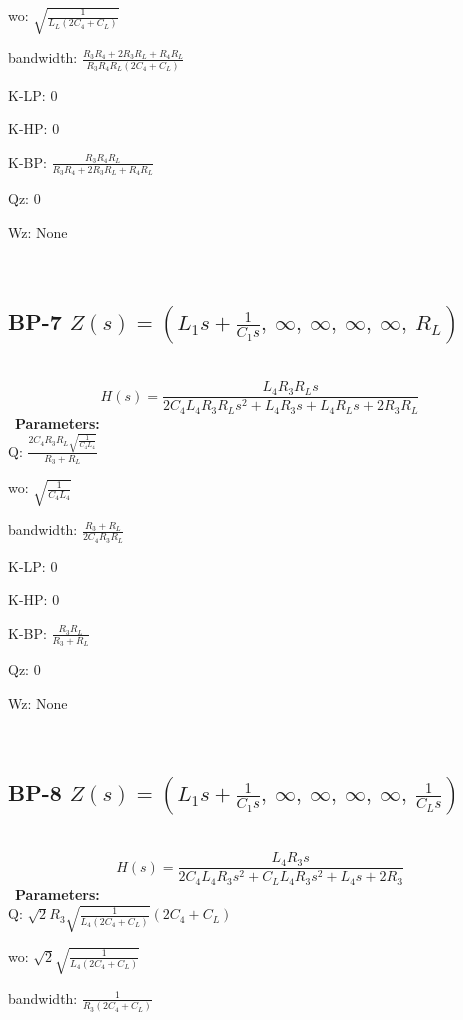 \documentclass{article}
\begin{document}
wo: $\sqrt{\frac{1}{L_{L} \left(2 C_{4} + C_{L}\right)}}$\ 

bandwidth: $\frac{R_{3} R_{4} + 2 R_{3} R_{L} + R_{4} R_{L}}{R_{3} R_{4} R_{L} \left(2 C_{4} + C_{L}\right)}$\ 

K-LP: $0$\ 

K-HP: $0$\ 

K-BP: $\frac{R_{3} R_{4} R_{L}}{R_{3} R_{4} + 2 R_{3} R_{L} + R_{4} R_{L}}$\ 

Qz: $0$\ 

Wz: $\text{None}$\ 

\ 

\subsection{BP-7 $Z(s) = \left( L_{1} s + \frac{1}{C_{1} s}, \  \infty, \  \infty, \  \infty, \  \infty, \  R_{L}\right)$ } \ 
\textbf{\[H(s) = \frac{L_{4} R_{3} R_{L} s}{2 C_{4} L_{4} R_{3} R_{L} s^{2} + L_{4} R_{3} s + L_{4} R_{L} s + 2 R_{3} R_{L}}\] } \ 
\textbf{Parameters:}\\ 

Q: $\frac{2 C_{4} R_{3} R_{L} \sqrt{\frac{1}{C_{4} L_{4}}}}{R_{3} + R_{L}}$\ 

wo: $\sqrt{\frac{1}{C_{4} L_{4}}}$\ 

bandwidth: $\frac{R_{3} + R_{L}}{2 C_{4} R_{3} R_{L}}$\ 

K-LP: $0$\ 

K-HP: $0$\ 

K-BP: $\frac{R_{3} R_{L}}{R_{3} + R_{L}}$\ 

Qz: $0$\ 

Wz: $\text{None}$\ 

\ 

\subsection{BP-8 $Z(s) = \left( L_{1} s + \frac{1}{C_{1} s}, \  \infty, \  \infty, \  \infty, \  \infty, \  \frac{1}{C_{L} s}\right)$ } \ 
\textbf{\[H(s) = \frac{L_{4} R_{3} s}{2 C_{4} L_{4} R_{3} s^{2} + C_{L} L_{4} R_{3} s^{2} + L_{4} s + 2 R_{3}}\] } \ 
\textbf{Parameters:}\\ 

Q: $\sqrt{2} R_{3} \sqrt{\frac{1}{L_{4} \left(2 C_{4} + C_{L}\right)}} \left(2 C_{4} + C_{L}\right)$\ 

wo: $\sqrt{2} \sqrt{\frac{1}{L_{4} \left(2 C_{4} + C_{L}\right)}}$\ 

bandwidth: $\frac{1}{R_{3} \left(2 C_{4} + C_{L}\right)}$\ 
\end{document}
